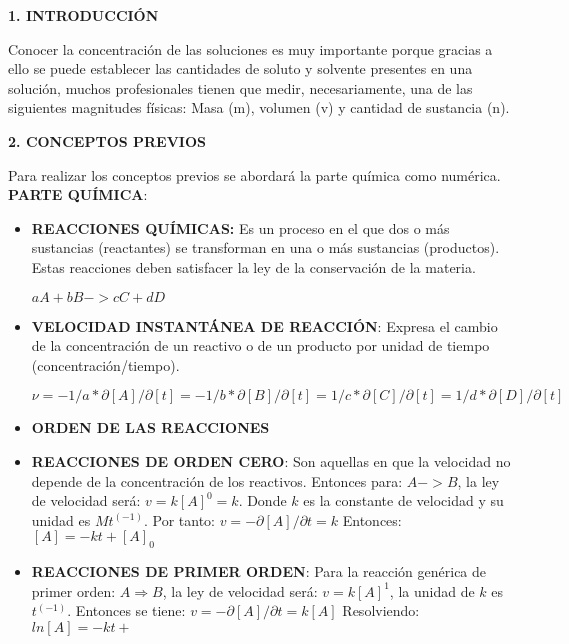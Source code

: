 \documentclass[10pt,a4paper]{article}
\begin{document}
\begin{multicols}{2}
\begin{center}
{\large \bf 1. INTRODUCCI\'ON}
\end{center}
Conocer la concentración de las soluciones es muy importante porque gracias a ello se puede establecer las cantidades de soluto y solvente presentes en una solución, muchos profesionales tienen que medir, necesariamente, una de las siguientes magnitudes físicas: Masa (m), volumen (v) y cantidad de sustancia (n). \\
 

\begin{center}
{\large \bf 2. CONCEPTOS PREVIOS}
\end{center}
Para realizar los conceptos previos se abordará la parte química como numérica.\\

\noindent \textbf{PARTE QUÍMICA}:

\begin{itemize}

	\item \textbf{REACCIONES QUÍMICAS:} Es un proceso en el que dos o más sustancias (reactantes) se transforman en una o más sustancias (productos). Estas reacciones deben satisfacer la ley de la conservación de la materia.
	\begin{center}
		$aA  +  bB  ->  cC  +  dD$
	\end{center}
	\item \textbf{VELOCIDAD INSTANTÁNEA DE REACCIÓN}: Expresa el cambio de la concentración de un reactivo o de un producto por unidad de tiempo (concentración/tiempo).
	\begin{center}
		$ ν = -1/a * ∂[A]/∂[t] =-1/b * ∂[B]/∂[t] =1/c * ∂[C]/∂[t] =1/d* ∂[D]/∂[t] $
	\end{center}

	\item \textbf{ORDEN DE LAS REACCIONES}
	\item \textbf{REACCIONES DE ORDEN CERO}: Son aquellas en que la velocidad no depende de la concentración de los reactivos. Entonces para: $A -> B$, la ley de velocidad será: $v=k[A]^0=k$. Donde $k$ es la constante de velocidad y su unidad es $Mt^(-1)$.
	Por tanto:
	$v=-∂[A]/∂t=k$
	Entonces:  $[A]=-kt+[A]_0$

	\item \textbf{REACCIONES DE PRIMER ORDEN}: Para la reacción genérica de primer orden: $A \Rightarrow B$, la ley de velocidad será: $v=k[A]^1$, la unidad de $k$ es $t^(-1)$. Entonces se tiene:
	$v=-∂[A]/∂t=k[A]$
	Resolviendo:   $ln[A]=-kt+ $
	

\end{itemize}
\end{multicols}
\end{document}
